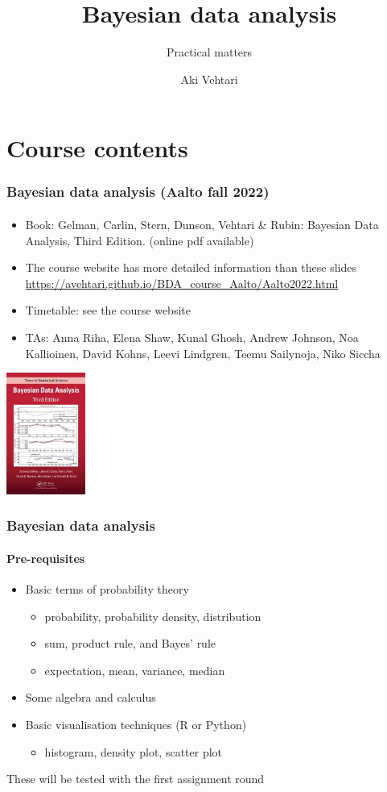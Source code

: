 \documentclass[english]{beamer}
\title[]{Bayesian data analysis}
\subtitle{Practical matters}
\author{Aki Vehtari}
\institute[Aalto University]{}
\begin{document}
\section{Course contents}


\begin{frame}
  \frametitle{Bayesian data analysis (Aalto fall 2022)}  %
  \framesubtitle{}
  \begin{itemize}
  \item Book: Gelman, Carlin, Stern, Dunson, Vehtari \& Rubin: Bayesian Data
    Analysis, Third Edition. {\footnotesize (online pdf available)}
  \item The course website has more detailed information than these slides\\
    {\small\url{https://avehtari.github.io/BDA_course_Aalto/Aalto2022.html}}
  \item Timetable: see the course website
  \item TAs: Anna Riha, Elena Shaw, Kunal Ghosh, Andrew Johnson, Noa
    Kallioinen, David Kohns, Leevi Lindgren, Teemu Sailynoja, Niko Siccha
    \end{itemize}
    \vspace{-\baselineskip}
 \begin{center}
   \includegraphics[width=2.6cm]{figs/BDA3.jpg}
 \end{center}

\end{frame}

\begin{frame}
  \frametitle{Bayesian data analysis}  %
  \framesubtitle{Pre-requisites}
  \begin{itemize}
  \item Basic terms of probability theory
    \begin{itemize}
    \item probability, probability density, distribution
    \item sum, product rule, and Bayes' rule
    \item expectation, mean, variance, median
    \end{itemize}
  \item Some algebra and calculus
  \item Basic visualisation techniques (R or Python)
    \begin{itemize}
    \item histogram, density plot, scatter plot
    \end{itemize}
  \end{itemize}

  These will be tested with the first assignment round

\end{frame}
\end{document}
